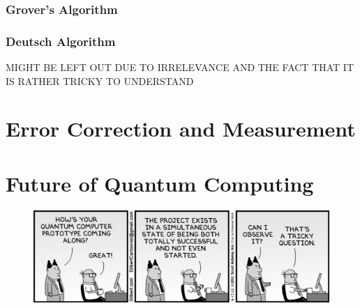 \documentclass[12pt]{article}
\begin{document}
\subsubsection{Grover's Algorithm}
\subsubsection{Deutsch Algorithm}
MIGHT BE LEFT OUT DUE TO IRRELEVANCE AND THE FACT THAT IT IS RATHER TRICKY TO UNDERSTAND
\section{Error Correction and Measurement}
\section{Future of Quantum Computing}


\begin{figure}
\includegraphics[scale=.5]{dilbert}
\centering
\end{figure}







\newpage
\end{document}
